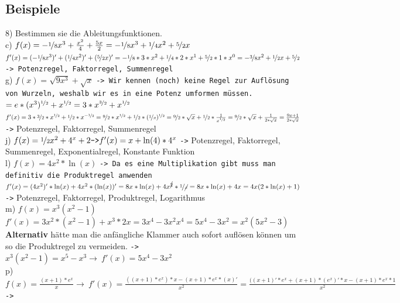 \documentclass{article}
\begin{document}
	\subsection{Beispiele}
	8) Bestimmen sie die Ableitungsfunktionen. \\
	c) $f(x)=-\nicefrac{1}{8}x^3+\frac{x^2}{4}+\frac{5x}{2}=-\nicefrac{1}{8}x^3+\nicefrac{1}{4}x^2+\nicefrac{5}{2}x$ \\
	$f'(x)=(-\nicefrac{1}{8}x^3)'+(\nicefrac{1}{4}x^2)'+(\nicefrac{5}{2}x)'=-\nicefrac{1}{8}*3*x^2+\nicefrac{1}{4}*2*x^1+\nicefrac{5}{2}*1*x^0=-\nicefrac{3}{8}x^2+\nicefrac{1}{2}x+\nicefrac{5}{2}$\verb|-> Potenzregel, Faktorregel, Summenregel|\\
	g) $f(x)=\sqrt{9x^3}+\sqrt{x}$ \verb|-> Wir kennen (noch) keine Regel zur Auflösung von Wurzeln, weshalb wir es in eine Potenz umformen müssen.| \\
	$=e*(x^3)^{\nicefrac{1}{2}}+x^{\nicefrac{1}{2}}=3*x^{\nicefrac{3}{2}}+x^{\nicefrac{1}{2}}$ \\
	$f'(x)=3*\nicefrac{3}{2}*x^{\nicefrac{1}{2}}+\nicefrac{1}{2}*x^{-\nicefrac{1}{2}}=\nicefrac{9}{2}*x^{\nicefrac{1}{2}}+\nicefrac{1}{2}*(\nicefrac{1}{x})^{\nicefrac{1}{2}}=\nicefrac{9}{2}*\sqrt{x}+\nicefrac{1}{2}*\frac{1}{x^{\nicefrac{1}{2}}}=\nicefrac{9}{2}*\sqrt{x}+\frac{1}{2*\sqrt{x}}=\frac{9x+1}{2*\sqrt{x}}$ \verb|->| Potenzregel, Faktorregel, Summenregel\\
	j) $f(x)=\nicefrac{1}{2}x^2+4^x+2 \verb|->| f'(x)=x+\ln(4)*4^x$ \verb|->| Potenzregel, Faktorregel, Summenregel, Exponentialregel, Konstante Funktion \\
	l) $f(x)=4x^2*\ln(x)$ \verb|-> Da es eine Multiplikation gibt muss man definitiv die Produktregel anwenden| \\
	$f'(x)=(4x^2)'*\ln(x)+4x^2*(\ln(x))'=8x*\ln(x)+4x^{\cancel{2}}*\nicefrac{1}{\cancel{x}}=8x*\ln(x)+4x=4x(2*\ln(x)+1)$ \verb|->| Potenzregel, Faktorregel, Produktregel, Logarithmus \\
	m) $f(x)=x^3(x^2-1)$ \\
	$f'(x)=3x^2*(x^2-1)+x^3*2x=3x^4-3x^2x^4=5x^4-3x^2=x^2(5x^2-3)$ \\
	\textbf{Alternativ} hätte man die anfängliche Klammer auch sofort auflösen können um so die Produktregel zu vermeiden. \verb|->| \\
	$x^3(x^2-1)=x^5-x^3\to\ f'(x)=5x^4-3x^2$\\
	p) $f(x)=\frac{(x+1)*e^x}{x}\to\ f'(x)=\frac{((x+1)*e^x)*x-(x+1)*e^x*(x)'}{x^2}=\frac{((x+1)'*e^x+(x+1)*(e^x)'*x-(x+1)*e^x*1}{x^2}$ \verb|->| \\
\end{document}
